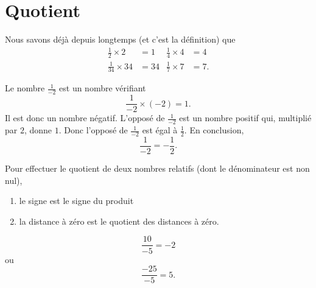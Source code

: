 \section{Quotient}

Nous savons déjà depuis longtemps (et c'est la définition) que
\begin{subequations}
    \begin{align}
        \frac{1}{ 2 }\times 2&=1&\frac{1}{ 4 }\times 4&=4\\
        \frac{1}{ 34 }\times 34&=34&\frac{1}{ 7 }\times 7&=7.
    \end{align}
\end{subequations}

Le nombre \( \frac{1}{ -2 }\) est un nombre vérifiant
\begin{equation}
    \frac{1}{ -2 }\times(-2)=1.
\end{equation}
Il est donc un nombre négatif. L'opposé de \( \frac{1}{ -2 }\) est un nombre positif qui, multiplié par \( 2\), donne \( 1\). Donc l'opposé de \( \frac{1}{ -2 }\) est égal à \( \frac{1}{ 2 }\). En conclusion,
\begin{equation}
    \frac{1}{ -2 }=-\frac{1}{ 2 }.
\end{equation}

\begin{Aretenir}
    Pour effectuer le quotient de deux nombres relatifs (dont le dénominateur est non nul),
    \begin{enumerate}
        \item
            le signe est le signe du produit
        \item
            la distance à zéro est le quotient des distances à zéro.
    \end{enumerate}
\end{Aretenir}

\begin{example}
    \begin{equation}
        \frac{ 10 }{ -5 }=-2
    \end{equation}
    ou
    \begin{equation}
        \frac{ -25 }{ -5 }=5.
    \end{equation}
\end{example}

